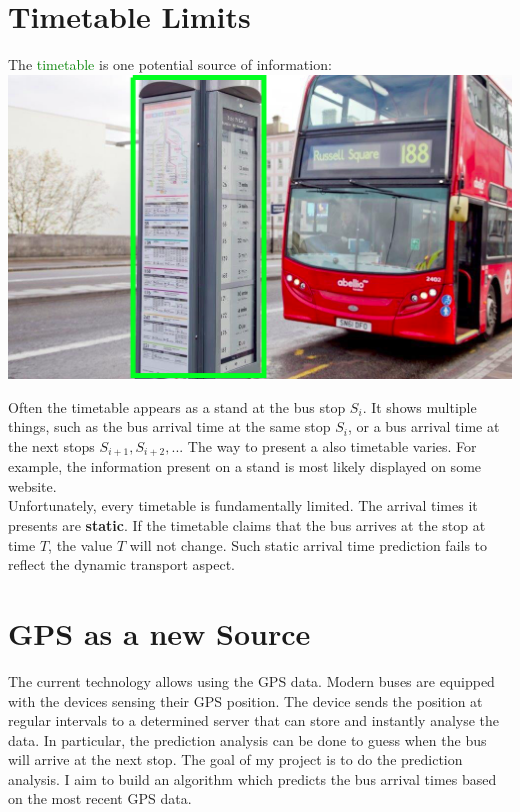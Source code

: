 \documentclass[12pt,a4paper,oneside,openright]{report}
\begin{document}
\section{Timetable Limits}

The \textcolor{green}{timetable} is one potential source of information: \\

\includegraphics[width=\textwidth]{figs/timetable_uk.png}

Often the timetable appears as a stand at the bus stop $S_i$. It shows multiple
things, such as the bus arrival time at the same stop $S_i$, or a bus arrival time
at the next stops $S_{i+1}, S_{i+2}, ...$ The way to present a also timetable varies.
For example, the information present on a stand is most likely displayed on some website. \\

Unfortunately, every timetable is fundamentally limited. The arrival times it presents
are \textbf{static}. If the timetable claims that the bus arrives at the stop at
time $T$, the value $T$ will not change. Such static arrival time prediction fails to
reflect the dynamic transport aspect. \\

\section{GPS as a new Source}

The current technology allows using the GPS data. Modern buses are equipped
with the devices sensing their GPS position. The device sends the position at regular
intervals to a determined server that can store and instantly analyse the data. In
particular, the prediction analysis can be done to guess when the bus will arrive at
the next stop. The goal of my project is to do the prediction analysis. I aim to build an
algorithm which predicts the bus arrival times based on the most recent GPS data.
\end{document}
